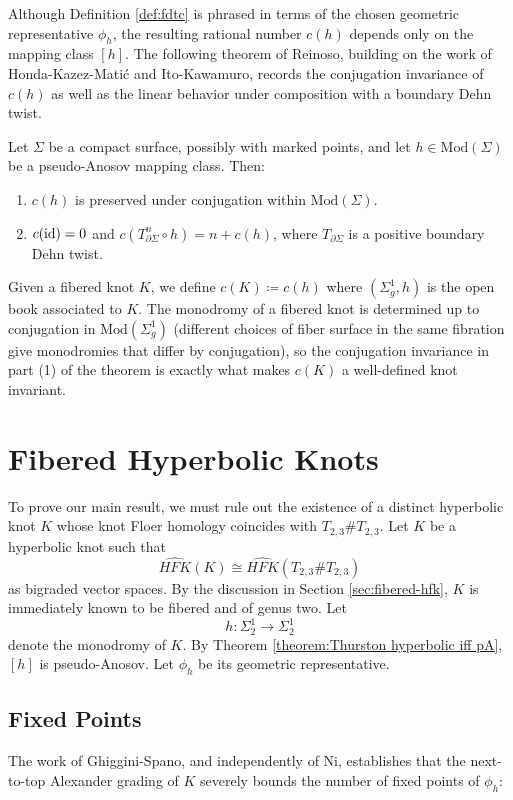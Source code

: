 Although Definition \ref{def:fdtc} is phrased in terms of the chosen geometric representative $\phi_h$, the resulting rational number $c(h)$ depends only on the mapping class $[h]$. The following theorem of Reinoso, building on the work of Honda-Kazez-Matić \cite{honda2007right} and Ito-Kawamuro, records the conjugation invariance of $c(h)$ as well as the linear behavior under composition with a boundary Dehn twist.

\begin{theorem}
   Let $\Sigma$ be a compact surface, possibly with marked points, and let $h \in \mathrm{Mod}(\Sigma)$ be a pseudo-Anosov mapping class. Then:
   \begin{enumerate}
       \item $c(h)$ is preserved under conjugation within $\mathrm{Mod}(\Sigma)$.
       \item $c(\operatorname{id}) = 0$ and $c(T_{\partial \Sigma}^n \circ h) = n + c(h)$, where $T_{\partial \Sigma}$ is a positive boundary Dehn twist.
   \end{enumerate}
\end{theorem}
Given a fibered knot $K$, we define $c(K) \coloneqq c(h)$ where $(\Sigma_g^1, h)$ is the open book associated to $K$. The monodromy of a fibered knot is determined up to conjugation in $\mathrm{Mod}(\Sigma_g^1)$ (different choices of fiber surface in the same fibration give monodromies that differ by conjugation), so the conjugation invariance in part (1) of the theorem is exactly what makes $c(K)$ a well-defined knot invariant.

\section{Fibered Hyperbolic Knots}\label{section:fibered hyperblic}
To prove our main result, we must rule out the existence of a distinct hyperbolic knot $K$ whose knot Floer homology coincides with $T_{2,3} \# T_{2,3}$. Let $K$ be a hyperbolic knot such that
\[
\widehat{HFK}(K) \cong \widehat{HFK}(T_{2,3} \# T_{2,3})
\]
as bigraded vector spaces. By the discussion in Section \ref{sec:fibered-hfk}, $K$ is immediately known to be fibered and of genus two. Let
\[
h \colon \Sigma_2^1 \to \Sigma_2^1
\]
denote the monodromy of $K$. By Theorem \ref{theorem:Thurston hyperbolic iff pA}, $[h]$ is pseudo-Anosov. Let $\phi_h$ be its geometric representative.

\subsection*{Fixed Points}
The work of Ghiggini-Spano, and independently of Ni, establishes that the next-to-top Alexander grading of $K$ severely bounds the number of fixed points of $\phi_h$:

